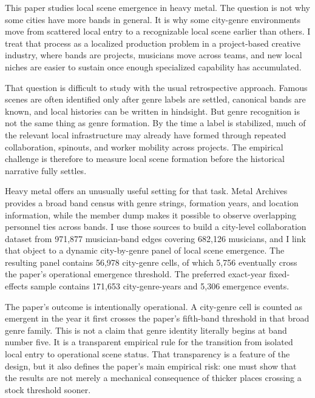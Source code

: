 This paper studies local scene emergence in heavy metal. The question is not why some cities have
more bands in general. It is why some city-genre environments move from scattered local entry to a
recognizable local scene earlier than others. I treat that process as a localized production
problem in a project-based creative industry, where bands are projects, musicians move across
teams, and new local niches are easier to sustain once enough specialized capability has
accumulated.

That question is difficult to study with the usual retrospective approach. Famous scenes are often
identified only after genre labels are settled, canonical bands are known, and local histories can
be written in hindsight. But genre recognition is not the same thing as genre formation. By the
time a label is stabilized, much of the relevant local infrastructure may already have formed
through repeated collaboration, spinouts, and worker mobility across projects. The empirical
challenge is therefore to measure local scene formation before the historical narrative fully
settles.

Heavy metal offers an unusually useful setting for that task. Metal Archives provides a broad band
census with genre strings, formation years, and location information, while the member dump makes
it possible to observe overlapping personnel ties across bands. I use those sources to build a
city-level collaboration dataset from 971,877 musician-band edges covering 682,126 musicians, and
I link that object to a dynamic city-by-genre panel of local scene emergence. The resulting panel
contains 56,978 city-genre cells, of which 5,756 eventually cross the paper's operational
emergence threshold. The preferred exact-year fixed-effects sample contains 171,653
city-genre-years and 5,306 emergence events.

The paper's outcome is intentionally operational. A city-genre cell is counted as emergent in the
year it first crosses the paper's fifth-band threshold in that broad genre family. This is not a
claim that genre identity literally begins at band number five. It is a transparent empirical rule
for the transition from isolated local entry to operational scene status. That transparency is a
feature of the design, but it also defines the paper's main empirical risk: one must show that the
results are not merely a mechanical consequence of thicker places crossing a stock threshold
sooner.

